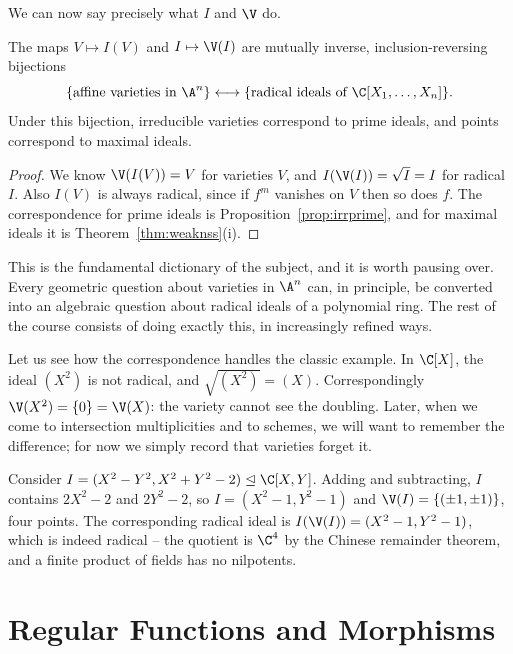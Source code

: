 We can now say precisely what $I$ and $\V$ do.

\begin{corollary}\label{cor:dictionary}
	The maps $V \mapsto I(V)$ and $I \mapsto \V(I)$ are mutually inverse, inclusion-reversing bijections
	$$\{\text{affine varieties in } \A^n\} \longleftrightarrow \{\text{radical ideals of } \C[X_1,\dots,X_n]\}.$$
	Under this bijection, irreducible varieties correspond to prime ideals, and points correspond to maximal ideals.
\end{corollary}

\begin{proof}
	We know $\V(I(V)) = V$ for varieties $V$, and $I(\V(I)) = \sqrt I = I$ for radical $I$. Also $I(V)$ is always radical, since if $f^m$ vanishes on $V$ then so does $f$. The correspondence for prime ideals is Proposition~\ref{prop:irrprime}, and for maximal ideals it is Theorem~\ref{thm:weaknss}(i).
\end{proof}

This is the fundamental dictionary of the subject, and it is worth pausing over. Every geometric question about varieties in $\A^n$ can, in principle, be converted into an algebraic question about radical ideals of a polynomial ring. The rest of the course consists of doing exactly this, in increasingly refined ways.

\begin{example}
	Let us see how the correspondence handles the classic example. In $\C[X]$, the ideal $(X^2)$ is not radical, and $\sqrt{(X^2)} = (X)$. Correspondingly $\V(X^2) = \{0\} = \V(X)$: the variety cannot see the doubling. Later, when we come to intersection multiplicities and to schemes, we will want to remember the difference; for now we simply record that varieties forget it.
\end{example}

\begin{example}
	Consider $I = (X^2 - Y^2, X^2+Y^2 - 2) \trianglelefteq \C[X,Y]$. Adding and subtracting, $I$ contains $2X^2 - 2$ and $2Y^2-2$, so $I = (X^2-1, Y^2-1)$ and $\V(I) = \{(\pm 1, \pm 1)\}$, four points. The corresponding radical ideal is $I(\V(I)) = (X^2-1,Y^2-1)$, which is indeed radical -- the quotient is $\C^4$ by the Chinese remainder theorem, and a finite product of fields has no nilpotents.
\end{example}

\section{Regular Functions and Morphisms}

